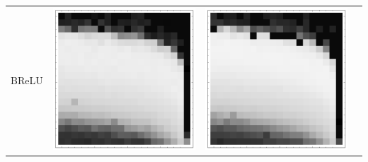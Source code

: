 \documentclass[10pt]{article}
\begin{document}
\begin{tabular}{|c|c|c|c|}
BReLU 
        & \includegraphics[scale=0.25]{plots/simple/LF-20B10B-20T10-MNIST-6.png}
        & \includegraphics[scale=0.25]{plots/simple/LF-40B10B-20T10-MNIST-6.png}

\end{tabular}
\end{document}
